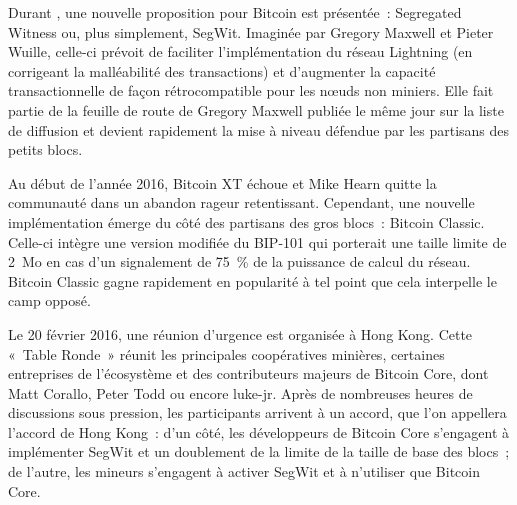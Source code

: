 Durant , une nouvelle proposition pour Bitcoin est présentée~: Segregated Witness ou, plus simplement, SegWit. Imaginée par Gregory Maxwell et Pieter Wuille, celle-ci prévoit de faciliter l'implémentation du réseau Lightning (en corrigeant la malléabilité des transactions) et d'augmenter la capacité transactionnelle de façon rétrocompatible pour les nœuds non miniers. Elle fait partie de la feuille de route de Gregory Maxwell publiée le même jour sur la liste de diffusion et devient rapidement la mise à niveau défendue par les partisans des petits blocs.

Au début de l'année 2016, Bitcoin XT échoue et Mike Hearn quitte la communauté dans un abandon rageur retentissant. Cependant, une nouvelle implémentation émerge du côté des partisans des gros blocs~: Bitcoin Classic. Celle-ci intègre une version modifiée du BIP-101 qui porterait une taille limite de 2~Mo en cas d'un signalement de 75~\% de la puissance de calcul du réseau. Bitcoin Classic gagne rapidement en popularité à tel point que cela interpelle le camp opposé.

Le 20 février 2016, une réunion d'urgence est organisée à Hong Kong. Cette «~Table Ronde~» réunit les principales coopératives minières, certaines entreprises de l'écosystème et des contributeurs majeurs de Bitcoin Core, dont Matt Corallo, Peter Todd ou encore luke-jr. Après de nombreuses heures de discussions sous pression, les participants arrivent à un accord, que l'on appellera l'accord de Hong Kong~: d'un côté, les développeurs de Bitcoin Core s'engagent à implémenter SegWit et un doublement de la limite de la taille de base des blocs~; de l'autre, les mineurs s'engagent à activer SegWit et à n'utiliser que Bitcoin Core.

